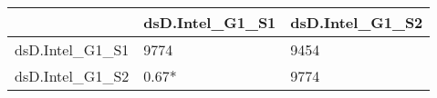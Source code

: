 \begin{table}[ht]
\centering
\begin{tabular}{rll}
  \hline
 & dsD.Intel\_G1\_S1 & dsD.Intel\_G1\_S2 \\ 
  \hline
dsD.Intel\_G1\_S1 & 9774 & 9454 \\ 
  dsD.Intel\_G1\_S2 &  0.67*  & 9774 \\ 
   \hline
\end{tabular}
\end{table}
